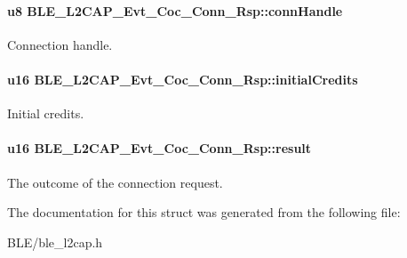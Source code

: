 \paragraph[{\texorpdfstring{conn\+Handle}{connHandle}}]{\setlength{\rightskip}{0pt plus 5cm}u8 B\+L\+E\+\_\+\+L2\+C\+A\+P\+\_\+\+Evt\+\_\+\+Coc\+\_\+\+Conn\+\_\+\+Rsp\+::conn\+Handle}\hypertarget{struct_b_l_e___l2_c_a_p___evt___coc___conn___rsp_aae244a60ba71fe2446da819ebd479d5b}{}\label{struct_b_l_e___l2_c_a_p___evt___coc___conn___rsp_aae244a60ba71fe2446da819ebd479d5b}
Connection handle. 
\paragraph[{\texorpdfstring{initial\+Credits}{initialCredits}}]{\setlength{\rightskip}{0pt plus 5cm}u16 B\+L\+E\+\_\+\+L2\+C\+A\+P\+\_\+\+Evt\+\_\+\+Coc\+\_\+\+Conn\+\_\+\+Rsp\+::initial\+Credits}\hypertarget{struct_b_l_e___l2_c_a_p___evt___coc___conn___rsp_ac918cb6104e814084150fc2fc25eac3d}{}\label{struct_b_l_e___l2_c_a_p___evt___coc___conn___rsp_ac918cb6104e814084150fc2fc25eac3d}
Initial credits. 
\paragraph[{\texorpdfstring{result}{result}}]{\setlength{\rightskip}{0pt plus 5cm}u16 B\+L\+E\+\_\+\+L2\+C\+A\+P\+\_\+\+Evt\+\_\+\+Coc\+\_\+\+Conn\+\_\+\+Rsp\+::result}\hypertarget{struct_b_l_e___l2_c_a_p___evt___coc___conn___rsp_a93ec63cf450db31ed2f2de786bc7d4d2}{}\label{struct_b_l_e___l2_c_a_p___evt___coc___conn___rsp_a93ec63cf450db31ed2f2de786bc7d4d2}
The outcome of the connection request. 

The documentation for this struct was generated from the following file\+:\begin{DoxyCompactItemize}
\item 
B\+L\+E/ble\+\_\+l2cap.\+h\end{DoxyCompactItemize}
